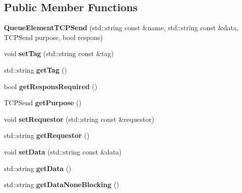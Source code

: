 \subsection*{Public Member Functions}
\begin{DoxyCompactItemize}
\item 
{\bfseries Queue\+Element\+T\+C\+P\+Send} (std\+::string const \&name, std\+::string const \&data, T\+C\+P\+Send purpose, bool respons)\hypertarget{classQueueElementTCPSend_a3aa9f7c8e3173d2864360e141d860fab}{}\label{classQueueElementTCPSend_a3aa9f7c8e3173d2864360e141d860fab}

\item 
void {\bfseries set\+Tag} (std\+::string const \&tag)\hypertarget{classQueueElementTCPSend_a198be59bc4f6f914c85027211fcb8aa1}{}\label{classQueueElementTCPSend_a198be59bc4f6f914c85027211fcb8aa1}

\item 
std\+::string {\bfseries get\+Tag} ()\hypertarget{classQueueElementTCPSend_a4383f6077d21932f6dead51d8a49f30d}{}\label{classQueueElementTCPSend_a4383f6077d21932f6dead51d8a49f30d}

\item 
bool {\bfseries get\+Respons\+Required} ()\hypertarget{classQueueElementTCPSend_a01857057cc95486764d996723a4a2f5e}{}\label{classQueueElementTCPSend_a01857057cc95486764d996723a4a2f5e}

\item 
T\+C\+P\+Send {\bfseries get\+Purpose} ()\hypertarget{classQueueElementTCPSend_a7a42ab6be9a3811c7eaee728b41c3754}{}\label{classQueueElementTCPSend_a7a42ab6be9a3811c7eaee728b41c3754}

\item 
void {\bfseries set\+Requestor} (std\+::string const \&requestor)\hypertarget{classQueueElementTCPSend_a788d2b6a8667c99a5d7282e65124c642}{}\label{classQueueElementTCPSend_a788d2b6a8667c99a5d7282e65124c642}

\item 
std\+::string {\bfseries get\+Requestor} ()\hypertarget{classQueueElementTCPSend_a4d75205d089624600e851ea7745caa16}{}\label{classQueueElementTCPSend_a4d75205d089624600e851ea7745caa16}

\item 
void {\bfseries set\+Data} (std\+::string const \&data)\hypertarget{classQueueElementTCPSend_aaa0e006f646046245095aa28b1cb2e98}{}\label{classQueueElementTCPSend_aaa0e006f646046245095aa28b1cb2e98}

\item 
std\+::string {\bfseries get\+Data} ()\hypertarget{classQueueElementTCPSend_a5537c19f909690c8aff22506d634af97}{}\label{classQueueElementTCPSend_a5537c19f909690c8aff22506d634af97}

\item 
std\+::string {\bfseries get\+Data\+None\+Blocking} ()\hypertarget{classQueueElementTCPSend_a37ff81fd3e511fb704478da714024f00}{}\label{classQueueElementTCPSend_a37ff81fd3e511fb704478da714024f00}

\end{DoxyCompactItemize}

